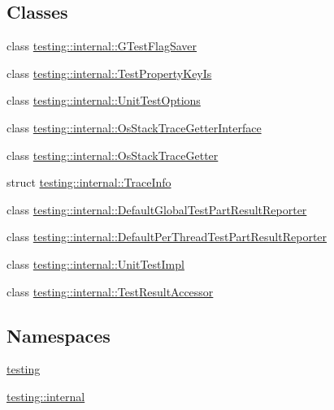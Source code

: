 \subsection*{Classes}
\begin{DoxyCompactItemize}
\item 
class \hyperlink{classtesting_1_1internal_1_1_g_test_flag_saver}{testing\+::internal\+::\+G\+Test\+Flag\+Saver}
\item 
class \hyperlink{classtesting_1_1internal_1_1_test_property_key_is}{testing\+::internal\+::\+Test\+Property\+Key\+Is}
\item 
class \hyperlink{classtesting_1_1internal_1_1_unit_test_options}{testing\+::internal\+::\+Unit\+Test\+Options}
\item 
class \hyperlink{classtesting_1_1internal_1_1_os_stack_trace_getter_interface}{testing\+::internal\+::\+Os\+Stack\+Trace\+Getter\+Interface}
\item 
class \hyperlink{classtesting_1_1internal_1_1_os_stack_trace_getter}{testing\+::internal\+::\+Os\+Stack\+Trace\+Getter}
\item 
struct \hyperlink{structtesting_1_1internal_1_1_trace_info}{testing\+::internal\+::\+Trace\+Info}
\item 
class \hyperlink{classtesting_1_1internal_1_1_default_global_test_part_result_reporter}{testing\+::internal\+::\+Default\+Global\+Test\+Part\+Result\+Reporter}
\item 
class \hyperlink{classtesting_1_1internal_1_1_default_per_thread_test_part_result_reporter}{testing\+::internal\+::\+Default\+Per\+Thread\+Test\+Part\+Result\+Reporter}
\item 
class \hyperlink{classtesting_1_1internal_1_1_unit_test_impl}{testing\+::internal\+::\+Unit\+Test\+Impl}
\item 
class \hyperlink{classtesting_1_1internal_1_1_test_result_accessor}{testing\+::internal\+::\+Test\+Result\+Accessor}
\end{DoxyCompactItemize}
\subsection*{Namespaces}
\begin{DoxyCompactItemize}
\item 
 \hyperlink{namespacetesting}{testing}
\item 
 \hyperlink{namespacetesting_1_1internal}{testing\+::internal}
\end{DoxyCompactItemize}
